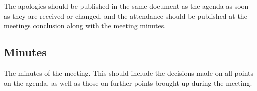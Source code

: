 \documentclass{report}
\begin{document}
\begin{center}
{\begin{minipage}{0.8\textwidth}
		The apologies should be published in the same document as the agenda as soon as they are received or changed, and the attendance should be published at the meetings conclusion along with the meeting minutes.
	
	\subsection*{Minutes}
	
		The minutes of the meeting. This should include the decisions made on all points on the agenda, as well as those on further points brought up during the meeting.

\vspace{0.05\textwidth}
\end{minipage}}
\end{center}
\end{document}
